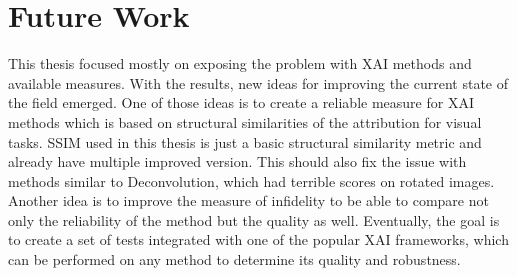 \section{Future Work}

This thesis focused mostly on exposing the problem with XAI methods and available measures. With the results, new ideas for improving the current state of the field emerged. One of those ideas is to create a reliable measure for XAI methods which is based on structural similarities of the attribution for visual tasks. SSIM used in this thesis is just a basic structural similarity metric and already have multiple improved version. This should also fix the issue with methods similar to Deconvolution, which had terrible scores on rotated images. Another idea is to improve the measure of infidelity to be able to compare not only the reliability of the method but the quality as well. Eventually, the goal is to create a set of tests integrated with one of the popular XAI frameworks, which can be performed on any method to determine its quality and robustness.